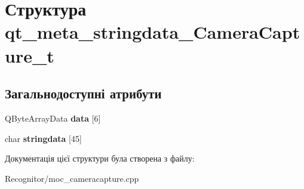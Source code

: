 \hypertarget{structqt__meta__stringdata__CameraCapture__t}{\section{Структура qt\-\_\-meta\-\_\-stringdata\-\_\-\-Camera\-Capture\-\_\-t}
\label{structqt__meta__stringdata__CameraCapture__t}
}
\subsection*{Загальнодоступні атрибути}
\begin{DoxyCompactItemize}
\item 
\hypertarget{structqt__meta__stringdata__CameraCapture__t_a0a501428764d9a198399568bd518a278}{Q\-Byte\-Array\-Data {\bfseries data} \mbox{[}6\mbox{]}}\label{structqt__meta__stringdata__CameraCapture__t_a0a501428764d9a198399568bd518a278}

\item 
\hypertarget{structqt__meta__stringdata__CameraCapture__t_acf4762e4529c8b66d172c23138da6344}{char {\bfseries stringdata} \mbox{[}45\mbox{]}}\label{structqt__meta__stringdata__CameraCapture__t_acf4762e4529c8b66d172c23138da6344}

\end{DoxyCompactItemize}


Документація цієї структури була створена з файлу\-:\begin{DoxyCompactItemize}
\item 
Recognitor/moc\-\_\-cameracapture.\-cpp\end{DoxyCompactItemize}
